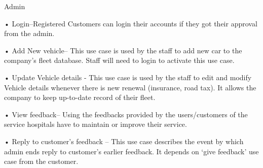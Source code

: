 \documentclass[a4paper,12pt]{report}
\begin{document}
	
	Admin
	
	• Login–Registered Customers can login their accounts if they got their approval from the admin.
	
	• Add New vehicle– This use case is used by the staff to add new car to the company's fleet database. Staff will need to login to activate this use case.
	
	• Update Vehicle details - This use case is used by the staff to edit and modify Vehicle details whenever there is new renewal (insurance, road tax). It allows the company to keep up-to-date record of their fleet. 
	
	• View feedback– Using the feedbacks provided by the users/customers of the service hospitals have to maintain or improve their service.
	
	• Reply to customer’s feedback – This use case describes the event by which admin ends reply to customer's earlier feedback. It depends on `give feedback' use case from the customer. \\
	
	
	
	
	
	
	
	
	
	
	
\end{document}
